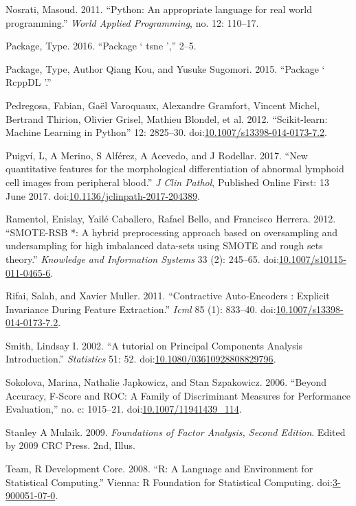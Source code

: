 \documentclass[]{article}
\begin{document}
Nosrati, Masoud. 2011. ``Python: An appropriate language for real world
programming.'' \emph{World Applied Programming}, no. 12: 110--17.

Package, Type. 2016. ``Package ` tsne ','' 2--5.

Package, Type, Author Qiang Kou, and Yusuke Sugomori. 2015. ``Package `
RcppDL '.''

Pedregosa, Fabian, Ga{ë}l Varoquaux, Alexandre Gramfort, Vincent Michel,
Bertrand Thirion, Olivier Grisel, Mathieu Blondel, et al. 2012.
``Scikit-learn: Machine Learning in Python'' 12: 2825--30.
doi:\href{http://dx.doi.org/10.1007/s13398-014-0173-7.2}{10.1007/s13398-014-0173-7.2}.

Puigv{í}, L, A Merino, S Alf{é}rez, A Acevedo, and J Rodellar. 2017.
``New quantitative features for the morphological differentiation of
abnormal lymphoid cell images from peripheral blood.'' \emph{J Clin
Pathol}, Published Online First: 13 June 2017.
doi:\href{http://dx.doi.org/10.1136/jclinpath-2017-204389}{10.1136/jclinpath-2017-204389}.

Ramentol, Enislay, Yail{é} Caballero, Rafael Bello, and Francisco
Herrera. 2012. ``SMOTE-RSB *: A hybrid preprocessing approach based on
oversampling and undersampling for high imbalanced data-sets using SMOTE
and rough sets theory.'' \emph{Knowledge and Information Systems} 33
(2): 245--65.
doi:\href{http://dx.doi.org/10.1007/s10115-011-0465-6}{10.1007/s10115-011-0465-6}.

Rifai, Salah, and Xavier Muller. 2011. ``Contractive Auto-Encoders :
Explicit Invariance During Feature Extraction.'' \emph{Icml} 85 (1):
833--40.
doi:\href{http://dx.doi.org/10.1007/s13398-014-0173-7.2}{10.1007/s13398-014-0173-7.2}.

Smith, Lindsay I. 2002. ``A tutorial on Principal Components Analysis
Introduction.'' \emph{Statistics} 51: 52.
doi:\href{http://dx.doi.org/10.1080/03610928808829796}{10.1080/03610928808829796}.

Sokolova, Marina, Nathalie Japkowicz, and Stan Szpakowicz. 2006.
``Beyond Accuracy, F-Score and ROC: A Family of Discriminant Measures
for Performance Evaluation,'' no. c: 1015--21.
doi:\href{http://dx.doi.org/10.1007/11941439_114}{10.1007/11941439\_114}.

Stanley A Mulaik. 2009. \emph{Foundations of Factor Analysis, Second
Edition}. Edited by 2009 {CRC Press}. 2nd, Illus.

Team, R Development Core. 2008. ``R: A Language and Environment for
Statistical Computing.'' Vienna: R Foundation for Statistical Computing.
doi:\href{http://dx.doi.org/3-900051-07-0}{3-900051-07-0}.
\end{document}
